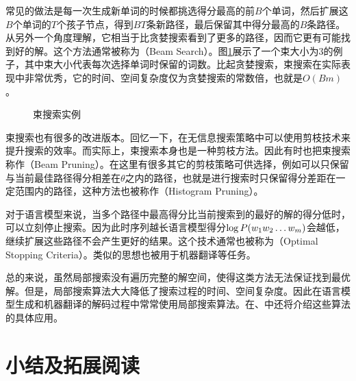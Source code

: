 \parinterval 常见的做法是每一次生成新单词的时候都挑选得分最高的前$B$个单词，然后扩展这$B$个单词的$T$个孩子节点，得到$BT$条新路径，最后保留其中得分最高的$B$条路径。从另外一个角度理解，它相当于比贪婪搜索看到了更多的路径，因而它更有可能找到好的解。这个方法通常被称为{\small{}}（Beam Search）。图\ref{fig:2-19}展示了一个束大小为3的例子，其中束大小代表每次选择单词时保留的词数。比起贪婪搜索，束搜索在实际表现中非常优秀，它的时间、空间复杂度仅为贪婪搜索的常数倍，也就是$O(Bm)$。

\begin{figure}[htp]
    \centering
 	
	\caption{束搜索实例}
    \label{fig:2-19}
\end{figure}

\parinterval 束搜索也有很多的改进版本。回忆一下，在无信息搜索策略中可以使用剪枝技术来提升搜索的效率。而实际上，束搜索本身也是一种剪枝方法。因此有时也把束搜索称作{\small{}}（Beam Pruning）。在这里有很多其它的剪枝策略可供选择，例如可以只保留与当前最佳路径得分相差在$\theta$之内的路径，也就是进行搜索时只保留得分差距在一定范围内的路径，这种方法也被称作{\small{}}（Histogram Pruning）。

\parinterval 对于语言模型来说，当多个路径中最高得分比当前搜索到的最好的解的得分低时，可以立刻停止搜索。因为此时序列越长语言模型得分$\log {P}(w_1 w_2 \ldots w_m)$会越低，继续扩展这些路径不会产生更好的结果。这个技术通常也被称为{\small{}}（Optimal Stopping Criteria）。类似的思想也被用于机器翻译等任务。

\parinterval 总的来说，虽然局部搜索没有遍历完整的解空间，使得这类方法无法保证找到最优解。但是，局部搜索算法大大降低了搜索过程的时间、空间复杂度。因此在语言模型生成和机器翻译的解码过程中常常使用局部搜索算法。在{\chapterseven}、{\chapterten}中还将介绍这些算法的具体应用。


\sectionnewpage
\section{小结及拓展阅读} \label{sec2:summary}

